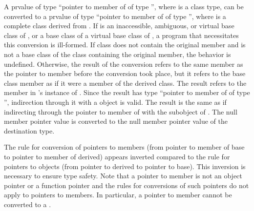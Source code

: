 \pnum
A prvalue of type ``pointer to member of  of type \cv{}
'', where  is a class type, can be converted to
a prvalue of type ``pointer to member of  of type \cv{}
'', where  is a complete class derived
from . If  is an
inaccessible,
ambiguous, or virtual base
class of , or a base class of a virtual base class of
, a program that necessitates this conversion is ill-formed.
If class  does not contain the original member and
is not a base class of the class containing the original member,
the behavior is undefined.
%
%
%
%
%
Otherwise,
the result of the conversion refers to the same member as the pointer to
member before the conversion took place, but it refers to the base class
member as if it were a member of the derived class. The result refers to
the member in 's instance of . Since the result has
type ``pointer to member of  of type \cv{} '',
indirection through it with a  object is valid. The result is the same
as if indirecting through the pointer to member of  with the
 subobject of . The null member pointer value is
converted to the null member pointer value of the destination
type.
\begin{footnote}
The rule for conversion of pointers to members (from pointer to member
of base to pointer to member of derived) appears inverted compared to
the rule for pointers to objects (from pointer to derived to pointer to
base). This inversion is
necessary to ensure type safety. Note that a pointer to member is not
an object pointer or a function pointer
and the rules for conversions
of such pointers do not apply to pointers to members.
%
In particular, a pointer to member cannot be converted to a
.
\end{footnote}


